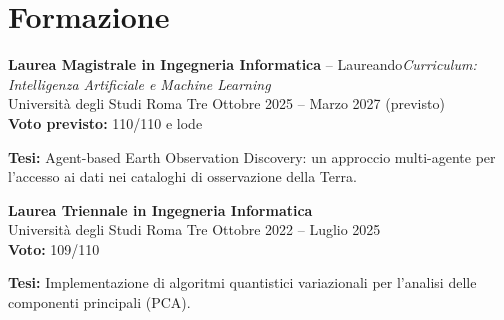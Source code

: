 \section{Formazione}

\textbf{Laurea Magistrale in Ingegneria Informatica} -- Laureando\hfill\textit{Curriculum: Intelligenza Artificiale e Machine Learning}\\
Universit\`a degli Studi Roma Tre \hfill Ottobre 2025 -- Marzo 2027 (previsto)\\
\textbf{Voto previsto:} 110/110 e lode\\
{\fontsize{9}{10.5}\selectfont \textbf{Tesi:} Agent-based Earth Observation Discovery: un approccio multi-agente per l'accesso ai dati nei cataloghi di osservazione della Terra.\par}

\vspace{0.15cm}

\textbf{Laurea Triennale in Ingegneria Informatica}\\
Universit\`a degli Studi Roma Tre \hfill Ottobre 2022 -- Luglio 2025\\
\textbf{Voto:} 109/110\\
{\small \textbf{Tesi:} Implementazione di algoritmi quantistici
variazionali per l'analisi delle componenti principali (PCA).\par}

